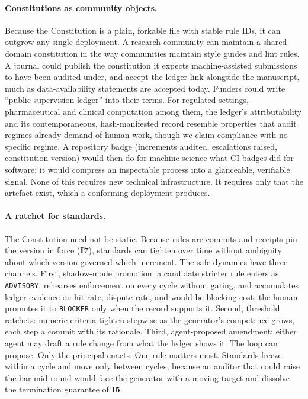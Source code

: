 \documentclass[11pt]{article}
\newcommand{\invariant}[1]{\textbf{I#1}}
\begin{document}
\paragraph{Constitutions as community objects.} Because the Constitution is a plain, forkable file with stable rule IDs, it can outgrow any single deployment. A research community can maintain a shared domain constitution in the way communities maintain style guides and lint rules. A journal could publish the constitution it expects machine-assisted submissions to have been audited under, and accept the ledger link alongside the manuscript, much as data-availability statements are accepted today. Funders could write ``public supervision ledger'' into their terms. For regulated settings, pharmaceutical and clinical computation among them, the ledger's attributability and its contemporaneous, hash-manifested record resemble properties that audit regimes already demand of human work, though we claim compliance with no specific regime. A repository badge (increments audited, escalations raised, constitution version) would then do for machine science what CI badges did for software: it would compress an inspectable process into a glanceable, verifiable signal. None of this requires new technical infrastructure. It requires only that the artefact exist, which a conforming deployment produces.

\paragraph{A ratchet for standards.} The Constitution need not be static. Because rules are commits and receipts pin the version in force (\invariant{7}), standards can tighten over time without ambiguity about which version governed which increment. The safe dynamics have three channels. First, shadow-mode promotion: a candidate stricter rule enters as \texttt{ADVISORY}, rehearses enforcement on every cycle without gating, and accumulates ledger evidence on hit rate, dispute rate, and would-be blocking cost; the human promotes it to \texttt{BLOCKER} only when the record supports it. Second, threshold ratchets: numeric criteria tighten stepwise as the generator's competence grows, each step a commit with its rationale. Third, agent-proposed amendment: either agent may draft a rule change from what the ledger shows it. The loop can propose. Only the principal enacts. One rule matters most. Standards freeze within a cycle and move only between cycles, because an auditor that could raise the bar mid-round would face the generator with a moving target and dissolve the termination guarantee of \invariant{5}.
\end{document}
